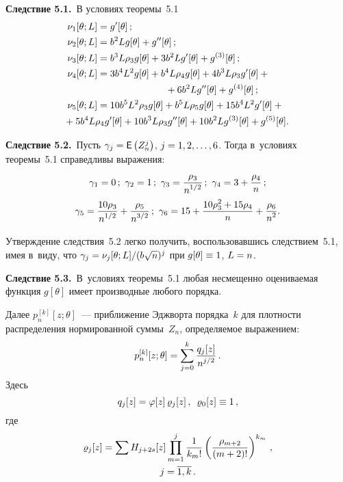 \begin{multicols}{2}
\noindent
\textbf{Следствие 5.1.}\
В условиях теоремы~5.1
 \begin{align*}
 \nu_1[\theta;L]&   =g'[\theta]\,;
\\
 \nu_2[\theta;L]&   =b^2 L g[\theta]+g''[\theta]\,;
\\
 \nu_3[\theta;L]&   =b^3 L\rho_3 g[\theta] +3 b^2 L g'[\theta]+g^{(3)}[\theta]\,;
\\
 \nu_4[\theta;L]&   =3 b^4 L^2 g[\theta]+b^4 L\rho_4 g[\theta] +
   4 b^3 L \rho_3 g'[\theta]+{}\\
   &\hspace*{25mm}{}+ 6 b^2 L g''[\theta]+g^{(4)}[\theta]\,;
\\
 \nu_5[\theta;L]&    =10 b^5 L^2\rho_3 g[\theta] +b^5 L\rho_5 g[\theta] +
   15 b^4 L^2 g'[\theta]+{}\\
&   \hspace*{-12.3mm}{}+5 b^4 L \rho_4 g'[\theta] +10 b^3 L \rho_3 g''[\theta]+10 b^2 L g^{(3)}[\theta]+g^{(5)}[\theta].
 \end{align*}


\noindent
\textbf{Следствие 5.2.}\
 Пусть $\gamma_j\hm=\Ep\left(Z_n^j\right)$,
$j\hm=1,2,\ldots,6$. Тогда в~условиях теоремы~5.1 справедливы выражения:
 \begin{gather*}
 \gamma_1=0\,;\ \gamma_2=1\,;\ \gamma_3=\displaystyle\frac{\displaystyle \rho_3\mathstrut}{\displaystyle n^{1/2}\mathstrut}\,;\
 \gamma_4=3+\displaystyle\frac{\displaystyle \rho_4\mathstrut}{\displaystyle n\mathstrut}\,;
\\
 \gamma_5
   =\displaystyle\frac{\displaystyle 10\rho_3\mathstrut}{\displaystyle n^{1/2}\mathstrut} +\displaystyle\frac{\displaystyle \rho_5\mathstrut}{\displaystyle n^{3/2}\mathstrut}\,;\
 \gamma_6=15+\displaystyle\frac{\displaystyle 10\rho_3^2+15\rho_4\mathstrut}{\displaystyle n\mathstrut}+\displaystyle\frac{\displaystyle \rho_6\mathstrut}{\displaystyle n^2\mathstrut}.
 \end{gather*}

\smallskip

  Утверждение следствия~5.2 легко получить, воспользовавшись следствием~5.1,
 имея в~виду, что $\gamma_j\hm=\nu_j[\theta;L]/(b\sqrt{n})^j$
 при $g[\theta]\hm\equiv 1$, $L\hm=n$.

\smallskip

\noindent
\textbf{Следствие 5.3.}\
 В~условиях теоремы~5.1 любая несмещенно
 оцениваемая функция $g[\theta]$ имеет производные любого порядка.

\smallskip

 Далее $p^{[k]}_n[z;\theta]$~--- приближение Эджворта порядка~$k$ для плотности 
 распределения нормированной суммы~$Z_n$, определяемое выражением:
 \begin{equation}
p^{[k]}_n[z;\theta]=\sum\limits_{j=0}^k \displaystyle\frac{\displaystyle q_j[z]\mathstrut}{\displaystyle n^{j/2}\mathstrut}\,.
 \label{6:0}
 \end{equation}
 Здесь
 $$
 q_j[z]=\varphi[z]\,\varrho_j[z]\,,\enskip \varrho_0[z]\equiv 1\,,
 $$
 где
 \begin{multline}
 \varrho_j[z]=\sum H_{j+2s}[z] \prod_{m=1}^j
 \displaystyle\frac{\displaystyle 1\mathstrut}{\displaystyle k_m !\mathstrut}\left(\displaystyle\frac{\displaystyle \rho_{m+2}\mathstrut}{\displaystyle (m+2)!\mathstrut} \right)^{k_m}\,,\\
 j=\overline{1,k}\,.
 \label{6:2}
 \end{multline}


\end{multicols}
